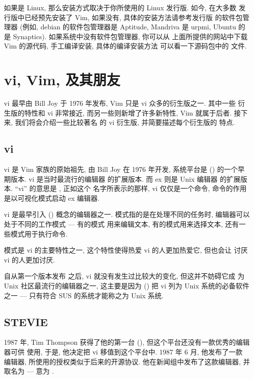 如果是 Linux, 那么安装方式取决于你所使用的 Linux 发行版. 如今, 在大多数
发行版中已经预先安装了 Vim, 如果没有, 具体的安装方法请参考发行版
的软件包管理器 (例如, debian 的软件包管理器是 Aptitude, Mandriva 是
urpmi, Ubuntu 的是 Synaptics). 如果系统中没有软件包管理器, 你可以从
上面所提供的网站中下载 Vim 的源代码, 手工编译安装, 具体的编译安装方法
可以看一下源码包中的  文件.

\section{vi, Vim, 及其朋友}
\label{sec:vi_vim_and_friends}
vi 最早由 Bill Joy 于 1976 年发布, Vim 只是 vi 众多的衍生版之一. 其中一些
衍生版的特性和 vi 非常接近, 而另一些则新增了许多新特性, Vim 就属于后者.
接下来, 我们将会介绍一些比较著名 的 vi 衍生版, 并简要描述每个衍生版的
特点.
\subsection{vi}
\label{subsec:vi}
vi 是 Vim 家族的原始祖先, 由 Bill Joy 在 1976 年开发, 系统平台是 
 () 的一个早期版本.
vi 是当时最流行的编辑器  的扩展版本. 而 ex 则是 Unix 编辑器 
 的扩展版本. ``vi'' 的意思是 , 正如这个
名字所表示的那样, vi 仅仅是一个命令, 命令的作用是以可视化模式启动 ex 
编辑器.

vi 是最早引入 () 概念的编辑器之一.
模式指的是在处理不同的任务时, 编辑器可以处于不同的工作模式 --- 有的模式
用来编辑文本, 有的模式用来选择文本, 还有一些模式用于执行命令.

模式是 vi 的主要特性之一, 这个特性使得热爱 vi 的人更加热爱它, 但也会让
讨厌 vi 的人更加讨厌.

自从第一个版本发布 之后, vi 就没有发生过比较大的变化, 但这并不妨碍它成
为 Unix 社区最流行的编辑器之一, 这主要是因为  () 把 vi 列为 Unix 系统的必备软件之一 --- 只有符合 
SUS 的系统才能称之为 Unix 系统.

\subsection{STEVIE}
\label{subsec:stevie}
1987 年, Tim Thompson 获得了他的第一台 
(), 但这个平台还没有一款优秀的编辑器可供
使用, 于是, 他决定把 vi 移值到这个平台中. 1987 年 6 月, 他发布了一款
编辑器, 所使用的授权类似于后来的开源协议. 他在新闻组中发布了这款编辑器,
并取名为  --- 意为 .


